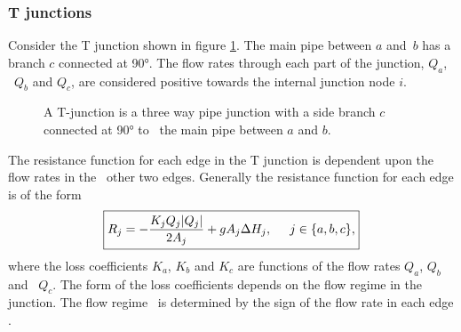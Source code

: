 \subsubsection{T junctions}

Consider the T junction shown in figure \ref{fig:t_junction_diagram}. The main pipe between $a$ and\
$b$ has a branch $c$ connected at 90°. The flow rates through each part of the junction, $Q_a$, \ 
$Q_b$ and $Q_c$, are considered positive towards the internal junction node $i$. 

\begin{figure}
    \centering
    \caption{A T-junction is a three way pipe junction with a side branch $c$ connected at 90° to 
    \ the main pipe between $a$ and $b$.}
    \label{fig:t_junction_diagram}
\end{figure}

The resistance function for each edge in the T junction is dependent upon the flow rates in the \
other two edges. Generally the resistance function for each edge is of the form
\begin{align}\label{eq:t_junction_resistance}
    \boxed{ R_j = - \frac{K_j Q_j |Q_j|}{2 A_j} + g A_j \Delta H_j, \hspace{0.5cm} j \in \{a,b,c\}, }
\end{align}
where the loss coefficients $K_a$, $K_b$ and $K_c$ are functions of the flow rates $Q_a$, $Q_b$ and \
$Q_c$. The form of the loss coefficients depends on the flow regime in the junction. The flow regime \
is determined by the sign of the flow rate in each edge \cite{rennels22}.

